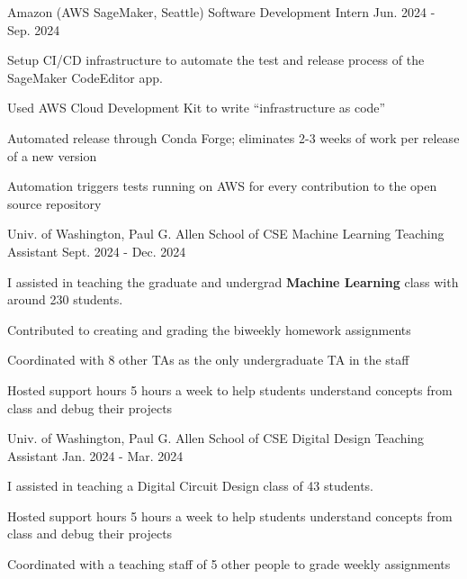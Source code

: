 \vspace{\sectionpadding}
\vspace{-0.5ex}
\vspace{-1.5ex}
\entry
    {Amazon (AWS SageMaker, Seattle)}
    {Software Development Intern}
    {Jun. 2024 - Sep. 2024}
    {
    Setup CI/CD infrastructure to automate the test and release process of the SageMaker CodeEditor app.
    \begin{condenseditemize}
        \item Used AWS Cloud Development Kit to write ``infrastructure as code''
        \item Automated release through Conda Forge; eliminates 2-3 weeks of work per release of a new version
        \item Automation triggers tests running on AWS for every contribution to the open source repository
    \end{condenseditemize}
    }

\entry
    {Univ. of Washington, Paul G. Allen School of CSE}
    {Machine Learning Teaching Assistant}
    {Sept. 2024 - Dec. 2024}
    {
    I assisted in teaching the graduate and undergrad \textbf{Machine Learning} class with around 230 students.
    \begin{condenseditemize}
        \item Contributed to creating and grading the biweekly homework assignments
        \item Coordinated with 8 other TAs as the only undergraduate TA in the staff
        \item Hosted support hours 5 hours a week to help students understand concepts from class and debug their projects
    \end{condenseditemize}
    }

\entry
    {Univ. of Washington, Paul G. Allen School of CSE}
    {Digital Design Teaching Assistant}
    {Jan. 2024 - Mar. 2024}
    {
    I assisted in teaching a Digital Circuit Design class of 43 students.
    \begin{condenseditemize}
        \item Hosted support hours 5 hours a week to help students understand concepts from class and debug their projects
        \item Coordinated with a teaching staff of 5 other people to grade weekly assignments
    \end{condenseditemize}
    }